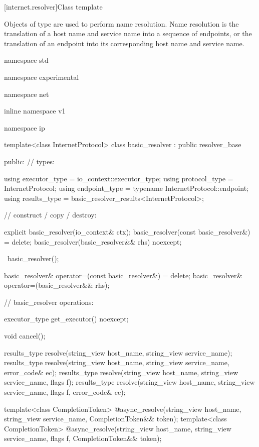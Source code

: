 %
[internet.resolver]{Class template }

\pnum
Objects of type  are used to perform name resolution. Name resolution is the translation of a host name and service name into a sequence of endpoints, or the translation of an endpoint into its corresponding host name and service name.

\begin{codeblock}
namespace std {
namespace experimental {
namespace net {
inline namespace v1 {
namespace ip {

  template<class InternetProtocol>
  class basic_resolver : public resolver_base
  {
  public:
    // types:

    using executor_type = io_context::executor_type;
    using protocol_type = InternetProtocol;
    using endpoint_type = typename InternetProtocol::endpoint;
    using results_type = basic_resolver_results<InternetProtocol>;

    // construct / copy / destroy:

    explicit basic_resolver(io_context& ctx);
    basic_resolver(const basic_resolver&) = delete;
    basic_resolver(basic_resolver&& rhs) noexcept;

    ~basic_resolver();

    basic_resolver& operator=(const basic_resolver&) = delete;
    basic_resolver& operator=(basic_resolver&& rhs);

    // basic_resolver operations:

    executor_type get_executor() noexcept;

    void cancel();

    results_type resolve(string_view host_name, string_view service_name);
    results_type resolve(string_view host_name, string_view service_name,
                         error_code& ec);
    results_type resolve(string_view host_name, string_view service_name,
                         flags f);
    results_type resolve(string_view host_name, string_view service_name,
                         flags f, error_code& ec);

    template<class CompletionToken>
      @\DEDUCED@ async_resolve(string_view host_name, string_view service_name,
                            CompletionToken&& token);
    template<class CompletionToken>
      @\DEDUCED@ async_resolve(string_view host_name, string_view service_name,
                            flags f, CompletionToken&& token);

}}}}}}
\end{codeblock}
